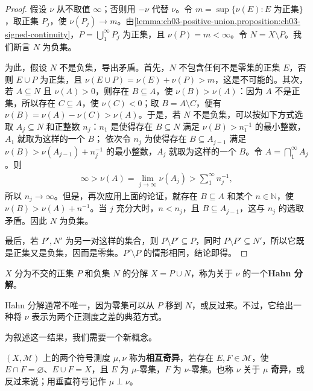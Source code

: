 \documentclass[../../main.tex]{subfiles}%
\begin{document}
\begin{proof}
假设 $\nu$ 从不取值 $\infty$；否则用 $-\nu$ 代替 $\nu$。令 $m=\sup\{\nu(E):E\text{ 为正集}\}$，取正集 $P_j$，使 $\nu(P_j)\to m$。由\cref{lemma:ch03-positive-union,proposition:ch03-signed-continuity}，$P=\bigcup_1^\infty P_j$ 为正集，且 $\nu(P)=m<\infty$。令 $N=X\setminus P$。我们断言 $N$ 为负集。

为此，假设 $N$ 不是负集，导出矛盾。首先，$N$ 不包含任何不是零集的正集 $E$，否则 $E\cup P$ 为正集，且 $\nu(E\cup P)=\nu(E)+\nu(P)>m$，这是不可能的。其次，若 $A\subseteq N$ 且 $\nu(A)>0$，则存在 $B\subseteq A$，使 $\nu(B)>\nu(A)$：因为 $A$ 不是正集，所以存在 $C\subseteq A$，使 $\nu(C)<0$；取 $B=A\setminus C$，便有 $\nu(B)=\nu(A)-\nu(C)>\nu(A)$。于是，若 $N$ 不是负集，可以按如下方式选取 $A_j\subseteq N$ 和正整数 $n_j$：$n_1$ 是使得存在 $B\subseteq N$ 满足 $\nu(B)>n_1^{-1}$ 的最小整数，$A_1$ 就取为这样的一个 $B$；
依次令 $n_j$ 为使得存在 $B\subseteq A_{j-1}$ 满足 $\nu(B)>\nu(A_{j-1})+n_j^{-1}$ 的最小整数，$A_j$ 就取为这样的一个 $B$。令 $A=\bigcap_1^\infty A_j$。则
\begin{align*}
\infty>\nu(A)=\lim_{j\to\infty}\nu(A_j)>\sum_1^\infty n_j^{-1},
\end{align*}
所以 $n_j\to\infty$。但是，再次应用上面的论证，就存在 $B\subseteq A$ 和某个 $n\in\mathbb{N}$，使 $\nu(B)>\nu(A)+n^{-1}$。当 $j$ 充分大时，$n<n_j$，且 $B\subseteq A_{j-1}$，这与 $n_j$ 的选取矛盾。因此 $N$ 为负集。

最后，若 $P',N'$ 为另一对这样的集合，则 $P\setminus P'\subseteq P$，同时 $P\setminus P'\subseteq N'$，所以它既是正集又是负集，因而是零集。$P'\setminus P$ 的情形相同，结论即得。
\end{proof}
\begin{definition}[Hahn 分解]\label{definition:ch03-hahn-decomposition}
$X$ 分为不交的正集 $P$ 和负集 $N$ 的分解 $X=P\cup N$，称为关于 $\nu$ 的一个\textbf{Hahn 分解}。
\end{definition}
\begin{remark}
Hahn 分解通常不唯一，因为零集可以从 $P$ 移到 $N$，或反过来。不过，它给出一种将 $\nu$ 表示为两个正测度之差的典范方式。
\end{remark}
为叙述这一结果，我们需要一个新概念。
\begin{definition}[相互奇异]\label{definition:ch03-mutually-singular}
$(X,\mathscr{M})$ 上的两个符号测度 $\mu,\nu$ 称为\textbf{相互奇异}，若存在 $E,F\in\mathscr{M}$，使 $E\cap F=\varnothing$、$E\cup F=X$，且 $E$ 为 $\mu$-零集，$F$ 为 $\nu$-零集。也称 $\nu$ 关于 $\mu$ \textbf{奇异}，或反过来说；用垂直符号记作 $\mu\perp\nu$。
\end{definition}
\end{document}
